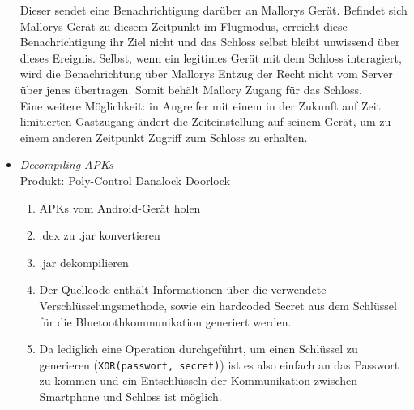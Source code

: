 \begin{itemize}[leftmargin=0cm,label={}]
                Dieser sendet eine Benachrichtigung darüber an Mallorys Gerät. 
                Befindet sich Mallorys Gerät zu diesem Zeitpunkt im Flugmodus, erreicht diese Benachrichtigung ihr Ziel nicht und das Schloss selbst bleibt unwissend über dieses Ereignis. 
                Selbst, wenn ein legitimes Gerät mit dem Schloss interagiert, wird die Benachrichtung über Mallorys Entzug der Recht nicht vom Server über jenes übertragen.
                Somit behält Mallory Zugang für das Schloss.\\
                Eine weitere Möglichkeit: in Angreifer mit einem in der Zukunft auf Zeit limitierten Gastzugang ändert die Zeiteinstellung auf seinem Gerät, um zu einem anderen Zeitpunkt Zugriff zum Schloss zu erhalten.
            \item \emph{Decompiling APKs}\cite{Rose2016}\label{vuln:decompile}\\
                Produkt: Poly-Control Danalock Doorlock\\
                \begin{enumerate}[noitemsep]
    	            \item APKs vom Android-Gerät holen
    	            \item .dex zu .jar konvertieren
    	            \item .jar dekompilieren
    	            \item Der Quellcode enthält Informationen über die verwendete Verschlüsselungsmethode, sowie ein hardcoded Secret aus dem Schlüssel für die Bluetoothkommunikation generiert werden.
    	            \item Da lediglich eine Operation durchgeführt, um einen Schlüssel zu generieren (\colorbox{light-gray}{\lstinline{XOR(passwort, secret)}}) ist es also einfach an das Passwort zu kommen und ein Entschlüsseln der Kommunikation zwischen Smartphone und Schloss ist möglich.
    	        \end{enumerate}
        \end{itemize}
        
